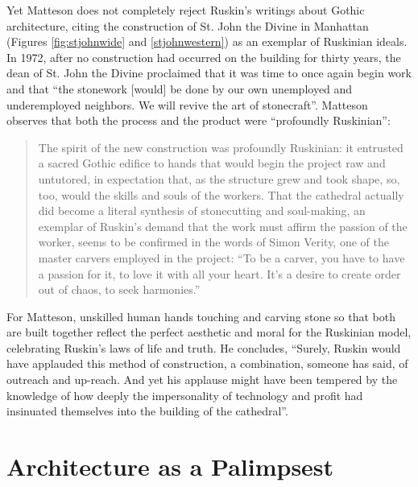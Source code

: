 Yet Matteson does not completely reject Ruskin’s writings about Gothic
architecture, citing the construction of St. John the Divine in
Manhattan (Figures \ref{fig:stjohnwide} and \ref{stjohnwestern}) as an exemplar of Ruskinian ideals.  In 1972,
after no construction had occurred on the building for thirty years,
the dean of St. John the Divine proclaimed that it was time to once
again begin work and that “the stonework [would] be done by our own
unemployed and underemployed neighbors.  We will revive the art of
stonecraft”\citep[][pg. 300]{matteson2002}. Matteson observes that both the
process and the product were ``profoundly
Ruskinian'': 


\begin{quote}
The spirit of the new construction was profoundly Ruskinian: it
entrusted a sacred Gothic edifice to hands that would begin the project
raw and untutored, in expectation that, as the structure grew and took
shape, so, too, would the skills and souls of the workers.  That the
cathedral actually did become a literal synthesis of stonecutting and
soul-making, an exemplar of Ruskin’s demand that the work must affirm
the passion of the worker, seems to be confirmed in the words of Simon
Verity, one of the master carvers employed in the project: “To be a
carver, you have to have a passion for it, to love it with all your
heart.  It’s a desire to create order out of chaos, to seek 
harmonies.”\citep[][pgs. 300--301]{matteson2002}
\end{quote}

For Matteson, unskilled human hands touching and carving stone so that
both are built together reflect the perfect aesthetic and moral for the
Ruskinian model, celebrating Ruskin’s laws of life and truth.  He
concludes, “Surely, Ruskin would have applauded this method of
construction, a combination, someone has said, of outreach and
up-reach.  And yet his applause might have been tempered by the
knowledge of how deeply the impersonality of technology and profit had
insinuated themselves into the building of the cathedral”\citep[][pg. 301]{matteson}.  

\section{Architecture as a Palimpsest}

